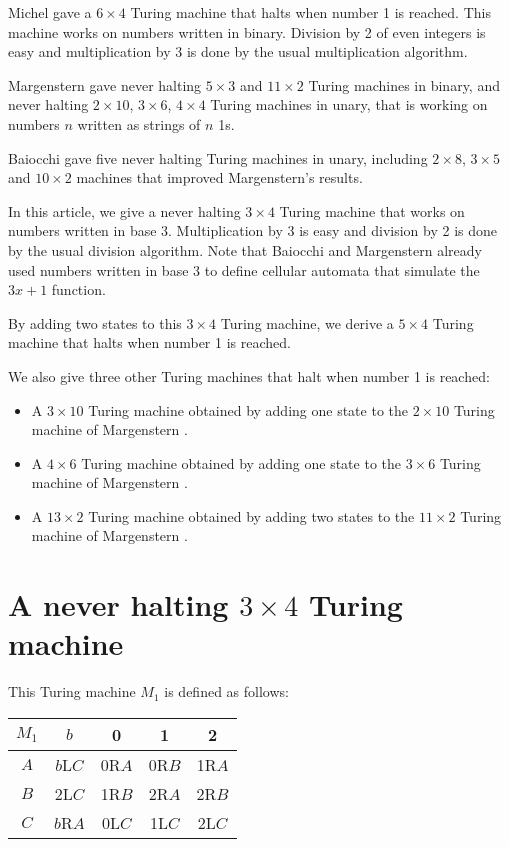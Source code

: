 \documentclass[10pt]{article}
\begin{document}
Michel \cite{Mi93} gave a $6 \times 4$ Turing machine that halts when number 1 is reached.
This machine works on numbers written in binary. Division by 2 of even integers
is easy and multiplication by 3 is done by the usual multiplication algorithm.

Margenstern \cite{Ma98,Ma00} gave never halting $5 \times 3$ and $11 \times 2$
Turing machines in binary, and never halting $2 \times 10$, $3 \times 6$,
$4 \times 4$ Turing machines in unary, that is working on numbers $n$ written
as strings of $n$ 1s.

Baiocchi \cite{Ba98} gave five never halting Turing machines in unary, including
$2 \times 8$, $3 \times 5$ and $10 \times 2$ machines that improved
Margenstern's results.

In this article, we give a never halting $3 \times 4$ Turing machine
that works on numbers written in base 3. Multiplication by  3 is easy
and division by 2 is done by the usual division algorithm.
Note that Baiocchi and Margenstern \cite{BM01} already used numbers written in base 3
to define cellular automata that simulate the $3x + 1$ function.

By adding two states to this $3 \times 4$ Turing machine,
we derive a $5 \times 4$ Turing machine that halts when number 1 is reached.

We also give three other Turing machines that halt when number 1 is reached:

\begin{itemize}
\item A $3 \times 10$ Turing machine obtained by adding one state to the
$2 \times 10$ Turing machine of Margenstern \cite{Ma98,Ma00}.
\item A $4 \times 6$ Turing machine obtained by adding one state to the
$3 \times 6$ Turing machine of Margenstern \cite{Ma98,Ma00}.
\item A $13 \times 2$ Turing machine obtained by adding two states to the
$11 \times 2$ Turing machine of Margenstern \cite{Ma98,Ma00}.
\end{itemize}

\section{A never halting $3 \times 4$ Turing machine}
This Turing machine $M_1$ is defined as follows:

\begin{center}
\begin{tabular}{|c|c|c|c|c|}
\hline
$M_1$ &  $b$  &   0   &   1   &   2 \\
\hline
$A$ & $b$L$C$ & 0R$A$ & 0R$B$ & 1R$A$ \\
\hline
$B$ &  2L$C$  & 1R$B$ & 2R$A$ & 2R$B$ \\
\hline
$C$ & $b$R$A$ & 0L$C$ & 1L$C$ & 2L$C$ \\
\hline
\end{tabular}
\end{center}
\end{document}
